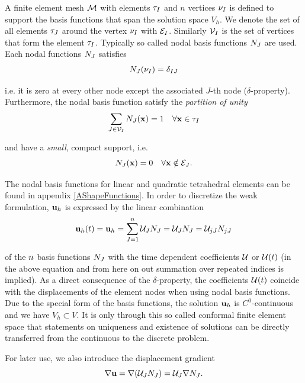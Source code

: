 A finite element mesh $\mathcal{M}$ with elements $\tau_I$ and $n$ vertices $\nu_I$ is defined to support the basis functions that span the solution space $V_h$. We denote the set of all elements $\tau_J$ around the vertex $\nu_I$ with $\mathcal{E}_I$. Similarly $\mathcal{V}_I$ is the set of vertices that form the element $\tau_I$. Typically so called nodal basis functions $N_J $ are used. Each nodal functions $N_J $ satisfies
\begin{equation}
N_J (\nu_I) = \delta _{IJ}  
\label{DeltaProperty}
\end{equation}

i.e. it is zero at every other node except the associated $J$-th node ($\delta$-property). Furthermore, the nodal basis function satisfy the \emph{partition of unity} 
\begin{equation}
\sum _{J \in \mathcal{V}_I } N_J (\mathbf {x} ) = 1 \quad \forall \mathbf {x}  \in \tau_I
\label{PartitionOfUnity}
\end{equation}

and have a \emph{small}, compact support, i.e.
\begin{equation}
 N_J (\mathbf {x} ) = 0 \quad \forall \mathbf {x}  \notin \mathcal{E}_J.
\end{equation}

The nodal basis functions for linear and quadratic tetrahedral elements can be found in appendix \ref{AShapeFunctions}. In order to discretize the weak formulation, $\mathbf {u} _h$ is expressed by the linear combination
\begin{equation}
\mathbf {u} _h (t) = \mathbf {u} _h  = \sum _{J=1} ^{n} \mathcal{U} _J   N_J   =   \mathcal{U} _J  N_J  =  \mathcal{U} _{jJ}   N_{jJ}  
\label{FEInterpolation}
\end{equation}

of the $n$ basis functions $N_J $ with the time dependent coefficients $\mathcal{U}  $ or $\mathcal{U}  (t)$ (in the above equation and from here on out summation over repeated indices is implied). As a direct consequence of the $\delta$-property, the coefficients $\mathcal{U}  (t)$ coincide with the displacements of the element nodes when using nodal basis functions. Due to the special form of the basis functions, the solution $\mathbf {u} _h$ is $C^0$-continuous and we have $V_h \subset V$. It is only through this so called conformal finite element space that statements on uniqueness and existence of solutions can be directly transferred from the continuous to the discrete problem.

For later use, we also introduce the displacement gradient 
\begin{equation}
\nabla \mathbf {u}   = \nabla (\mathcal{U} _J  N_J  ) = \mathcal{U} _J \nabla N_J .
\label{DiscreteDispGradient}
\end{equation}


